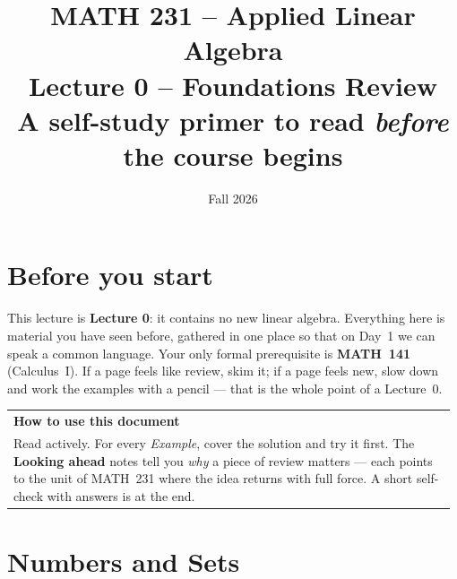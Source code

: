\documentclass[11pt]{article}
\title{\vspace{-1.2cm}\textbf{\sffamily MATH 231 -- Applied Linear Algebra}\\[4pt]
       {\large\sffamily Lecture 0 -- Foundations Review}\\[2pt]
       {\normalsize\sffamily A self-study primer to read \emph{before} the course begins}}
\author{}
\date{\normalsize\sffamily Fall 2026}
\makeatletter
\theoremstyle{definition}
\newcommand{\keybox}[2]{%
  \par\smallskip\noindent
  \begin{tabular}{@{}p{0.985\linewidth}@{}}
  \arrayrulecolor{RoyalBlue}\toprule
  {\sffamily\bfseries\color{RoyalBlue}#1}\\[2pt]#2\\
  \bottomrule
  \end{tabular}\par\smallskip}
\makeatother
\begin{document}
\maketitle
\vspace{-1.0cm}

\section*{Before you start}
This lecture is \textbf{Lecture 0}: it contains no new linear algebra. Everything
here is material you have seen before, gathered in one place so that on Day~1 we
can speak a common language. Your only formal prerequisite is \textbf{MATH~141}
(Calculus~I). If a page feels like review, skim it; if a page feels new, slow
down and work the examples with a pencil --- that is the whole point of a Lecture~0.

\keybox{How to use this document}{%
Read actively. For every \emph{Example}, cover the solution and try it first.
The \textcolor{BrickRed}{\textbf{\textsf{Looking ahead}}} notes tell you
\emph{why} a piece of review matters --- each points to the unit of MATH~231
where the idea returns with full force. A short self-check with answers is at the
end.}

\tableofcontents
\bigskip

\section{Numbers and Sets}
\end{document}

